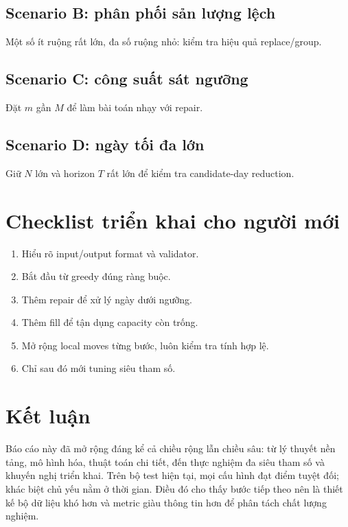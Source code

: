 \documentclass[12pt,a4paper]{article}
\begin{document}
\subsection{Scenario B: phân phối sản lượng lệch}
Một số ít ruộng rất lớn, đa số ruộng nhỏ: kiểm tra hiệu quả replace/group.

\subsection{Scenario C: công suất sát ngưỡng}
Đặt $m$ gần $M$ để làm bài toán nhạy với repair.

\subsection{Scenario D: ngày tối đa lớn}
Giữ $N$ lớn và horizon $T$ rất lớn để kiểm tra candidate-day reduction.

\section{Checklist triển khai cho người mới}
\begin{enumerate}
  \item Hiểu rõ input/output format và validator.
  \item Bắt đầu từ greedy đúng ràng buộc.
  \item Thêm repair để xử lý ngày dưới ngưỡng.
  \item Thêm fill để tận dụng capacity còn trống.
  \item Mở rộng local moves từng bước, luôn kiểm tra tính hợp lệ.
  \item Chỉ sau đó mới tuning siêu tham số.
\end{enumerate}

\section{Kết luận}
Báo cáo này đã mở rộng đáng kể cả chiều rộng lẫn chiều sâu: từ lý thuyết nền tảng, mô hình hóa, thuật toán chi tiết, đến thực nghiệm đa siêu tham số và khuyến nghị triển khai. Trên bộ test hiện tại, mọi cấu hình đạt điểm tuyệt đối; khác biệt chủ yếu nằm ở thời gian. Điều đó cho thấy bước tiếp theo nên là thiết kế bộ dữ liệu khó hơn và metric giàu thông tin hơn để phân tách chất lượng nghiệm.

\appendix
\end{document}
